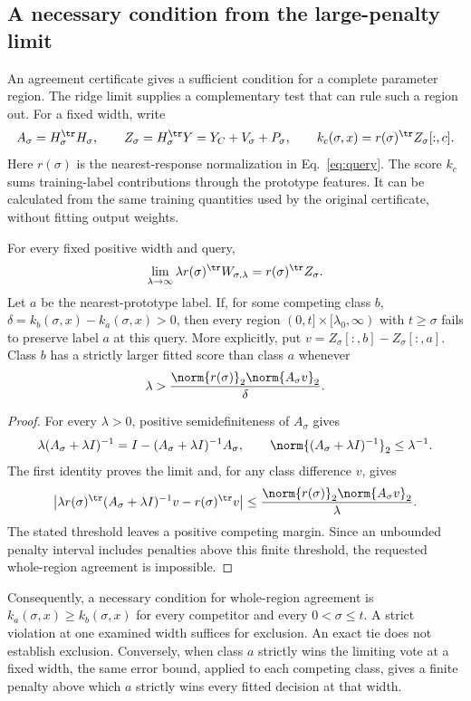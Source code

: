 \subsection{A necessary condition from the large-penalty limit}
\label{sec:ridge-obstruction}
An agreement certificate gives a sufficient condition for a complete parameter
region. The ridge limit supplies a complementary test that can rule such a
region out. For a fixed width, write
\[
 A_\sigma=H_\sigma^\tr H_\sigma,\qquad
 Z_\sigma=H_\sigma^\tr Y=Y_C+V_\sigma+P_\sigma,
 \qquad k_c(\sigma,x)=r(\sigma)^\tr Z_\sigma[:,c].
\]
Here $r(\sigma)$ is the nearest-response normalization in
Eq.~\eqref{eq:query}. The score $k_c$ sums training-label contributions
through the prototype features. It can be calculated from the same training
quantities used by the original certificate, without fitting output weights.

\begin{proposition}
\label{prop:ridge-limit}
For every fixed positive width and query,
\[
 \lim_{\lambda\to\infty}\lambda r(\sigma)^\tr W_{\sigma,\lambda}
 =r(\sigma)^\tr Z_\sigma.
\]
Let $a$ be the nearest-prototype label. If, for some competing class $b$,
$\delta=k_b(\sigma,x)-k_a(\sigma,x)>0$, then every region
$(0,t]\times[\lambda_0,\infty)$ with $t\geq\sigma$ fails to preserve
label $a$ at this query. More explicitly, put
$v=Z_\sigma[:,b]-Z_\sigma[:,a]$. Class $b$ has a strictly larger fitted
score than class $a$ whenever
\[
 \lambda>\frac{\norm{r(\sigma)}_2\norm{A_\sigma v}_2}{\delta}.
\]
\end{proposition}
\begin{proof}
For every $\lambda>0$, positive semidefiniteness of $A_\sigma$ gives
\[
 \lambda(A_\sigma+\lambda I)^{-1}
 =I-(A_\sigma+\lambda I)^{-1}A_\sigma,
 \qquad
 \norm{(A_\sigma+\lambda I)^{-1}}_2\leq\lambda^{-1}.
\]
The first identity proves the limit and, for any class difference $v$, gives
\[
 \left|\lambda r(\sigma)^\tr(A_\sigma+\lambda I)^{-1}v
              -r(\sigma)^\tr v\right|
 \leq\frac{\norm{r(\sigma)}_2\norm{A_\sigma v}_2}{\lambda}.
\]
The stated threshold leaves a positive competing margin. Since an unbounded
penalty interval includes penalties above this finite threshold, the requested
whole-region agreement is impossible.
\end{proof}

Consequently, a necessary condition for whole-region agreement is
$k_a(\sigma,x)\geq k_b(\sigma,x)$ for every competitor and every
$0<\sigma\leq t$. A strict violation at one examined width suffices for
exclusion. An exact tie does not establish exclusion. Conversely, when class
$a$ strictly wins the limiting vote at a fixed width, the same error bound,
applied to each competing class, gives a finite penalty above which $a$
strictly wins every fitted decision at that width.


